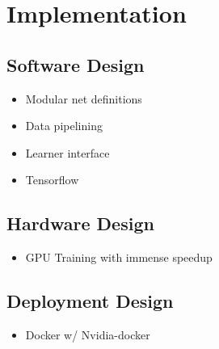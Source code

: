 \chapter{Implementation}

\section{Software Design}

\begin{itemize}
	\item Modular net definitions
	\item Data pipelining
	\item Learner interface
	\item Tensorflow
\end{itemize}

\section{Hardware Design}

\begin{itemize}
	\item GPU Training with immense speedup
\end{itemize}

\section{Deployment Design}

\begin{itemize}
	\item Docker w/ Nvidia-docker
\end{itemize}